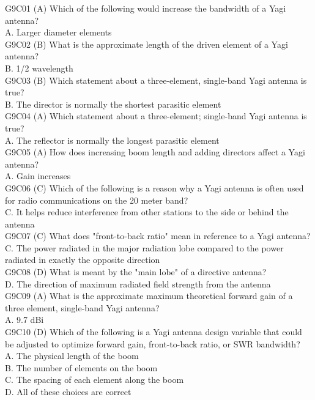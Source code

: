 \documentclass[12pt,letterpaper]{report}
\begin{document}
G9C01 (A) Which of the following would increase the bandwidth of a Yagi antenna?\\
A. Larger diameter elements\\

G9C02 (B) What is the approximate length of the driven element of a Yagi antenna?\\
B. 1/2 wavelength\\

G9C03 (B) Which statement about a three-element, single-band Yagi antenna is true?\\
B. The director is normally the shortest parasitic element\\

G9C04 (A) Which statement about a three-element; single-band Yagi antenna is true?\\
A. The reflector is normally the longest parasitic element\\

G9C05 (A) How does increasing boom length and adding directors affect a Yagi antenna?\\
A. Gain increases\\

G9C06 (C) Which of the following is a reason why a Yagi antenna is often used for radio communications on the 20 meter band?\\
C. It helps reduce interference from other stations to the side or behind the antenna\\

G9C07 (C) What does "front-to-back ratio" mean in reference to a Yagi antenna?\\
C. The power radiated in the major radiation lobe compared to the power radiated in exactly the opposite direction\\

G9C08 (D) What is meant by the "main lobe" of a directive antenna?\\
D. The direction of maximum radiated field strength from the antenna\\

G9C09 (A) What is the approximate maximum theoretical forward gain of a three element, single-band Yagi antenna?\\
A. 9.7 dBi\\

G9C10 (D) Which of the following is a Yagi antenna design variable that could be adjusted to optimize forward gain, front-to-back ratio, or SWR bandwidth? \\
A. The physical length of the boom\\
B. The number of elements on the boom\\
C. The spacing of each element along the boom\\
D. All of these choices are correct\\
\end{document}
